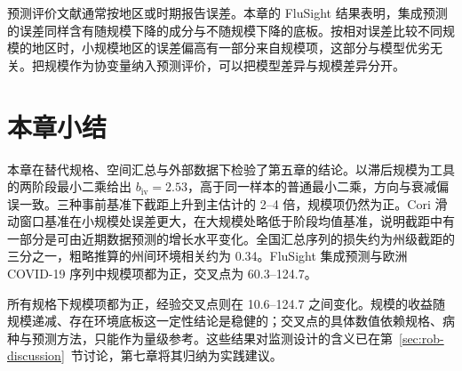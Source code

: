 预测评价文献通常按地区或时期报告误差\citep{reich2019accuracy, cramer2022evaluation}。本章的 FluSight 结果表明，集成预测的误差同样含有随规模下降的成分与不随规模下降的底板。按相对误差比较不同规模的地区时，小规模地区的误差偏高有一部分来自规模项，这部分与模型优劣无关。把规模作为协变量纳入预测评价，可以把模型差异与规模差异分开。

\section{本章小结}
\label{sec:rob-summary}

本章在替代规格、空间汇总与外部数据下检验了第五章的结论。以滞后规模为工具的两阶段最小二乘给出 $b_{\mathrm{iv}}=2.53$，高于同一样本的普通最小二乘，方向与衰减偏误一致。三种事前基准下截距上升到主估计的 2--4 倍，规模项仍然为正。Cori 滑动窗口基准在小规模处误差更大，在大规模处略低于阶段均值基准，说明截距中有一部分是可由近期数据预测的增长水平变化。全国汇总序列的损失约为州级截距的三分之一，粗略推算的州间环境相关约为 0.34。FluSight 集成预测与欧洲 COVID-19 序列中规模项都为正，交叉点为 60.3--124.7。

所有规格下规模项都为正，经验交叉点则在 10.6--124.7 之间变化。规模的收益随规模递减、存在环境底板这一定性结论是稳健的；交叉点的具体数值依赖规格、病种与预测方法，只能作为量级参考。这些结果对监测设计的含义已在第~\ref{sec:rob-discussion}~节讨论，第七章将其归纳为实践建议。
